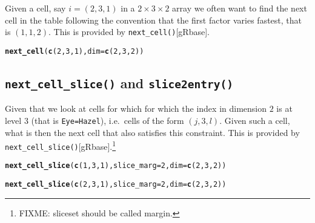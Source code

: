 \documentclass[10pt]{article}\usepackage[]{graphicx}\usepackage[]{xcolor}
\makeatletter
\newcommand{\hlnum}[1]{\textcolor[rgb]{0.686,0.059,0.569}{#1}}%
\newcommand{\hlstd}[1]{\textcolor[rgb]{0.345,0.345,0.345}{#1}}%
\newcommand{\hlkwc}[1]{\textcolor[rgb]{0.333,0.667,0.333}{#1}}%
\newcommand{\hlkwd}[1]{\textcolor[rgb]{0.737,0.353,0.396}{\textbf{#1}}}%
\newenvironment{kframe}{%
 \def\at@end@of@kframe{}%
 \ifinner\ifhmode%
  \def\at@end@of@kframe{\end{minipage}}%
  \begin{minipage}{\columnwidth}%
 \fi\fi%
 \def\FrameCommand##1{\hskip\@totalleftmargin \hskip-\fboxsep
 \colorbox{shadecolor}{##1}\hskip-\fboxsep
     \hskip-\linewidth \hskip-\@totalleftmargin \hskip\columnwidth}%
 \MakeFramed {\advance\hsize-\width
   \@totalleftmargin\z@ \linewidth\hsize
   \@setminipage}}%
 {\par\unskip\endMakeFramed%
 \at@end@of@kframe}
\newenvironment{knitrout}{}{} %
\def\code#1{\texttt{#1}}
\def\rr#1{\code{#1}[{\scriptsize gRbase}]}
\makeatother
\begin{document}
Given a cell, say $i=(2,3,1)$ in a $2\times 3\times 2$ array we often want to find the next cell in
the table following the convention that the first factor varies
fastest, that is $(1,1,2)$. This is provided by
\rr{next\_cell()}.
\begin{knitrout}\small
{}\color{fgcolor}\begin{kframe}
\begin{alltt}
\hlkwd{next_cell}\hlstd{(}\hlkwd{c}\hlstd{(}\hlnum{2}\hlstd{,}\hlnum{3}\hlstd{,}\hlnum{1}\hlstd{),} \hlkwc{dim}\hlstd{=}\hlkwd{c}\hlstd{(}\hlnum{2}\hlstd{,} \hlnum{3}\hlstd{,} \hlnum{2}\hlstd{))}
\end{alltt}


{\ttfamily\noindent\bfseries{}}\end{kframe}
\end{knitrout}


\subsection{\code{next\_cell\_slice()} and \code{slice2entry()}}

Given that we look at cells for which for which the index in dimension $2$ is at level $3$ (that is
\verb|Eye=Hazel|), i.e.\ cells of the form $(j,3,l)$. Given such a
cell, what is then the next cell that also satisfies this
constraint. This is provided by
\rr{next\_cell\_slice()}.\footnote{FIXME: sliceset should be called margin.}
\begin{knitrout}\small
{}\color{fgcolor}\begin{kframe}
\begin{alltt}
\hlkwd{next_cell_slice}\hlstd{(}\hlkwd{c}\hlstd{(}\hlnum{1}\hlstd{,}\hlnum{3}\hlstd{,}\hlnum{1}\hlstd{),} \hlkwc{slice_marg}\hlstd{=}\hlnum{2}\hlstd{,} \hlkwc{dim}\hlstd{=}\hlkwd{c}\hlstd{(} \hlnum{2}\hlstd{,} \hlnum{3}\hlstd{,} \hlnum{2} \hlstd{))}
\end{alltt}


{\ttfamily\noindent\bfseries{}}\begin{alltt}
\hlkwd{next_cell_slice}\hlstd{(}\hlkwd{c}\hlstd{(}\hlnum{2}\hlstd{,}\hlnum{3}\hlstd{,}\hlnum{1}\hlstd{),} \hlkwc{slice_marg}\hlstd{=}\hlnum{2}\hlstd{,} \hlkwc{dim}\hlstd{=}\hlkwd{c}\hlstd{(} \hlnum{2}\hlstd{,} \hlnum{3}\hlstd{,} \hlnum{2} \hlstd{))}
\end{alltt}


{\ttfamily\noindent\bfseries{}}\end{kframe}
\end{knitrout}
\end{document}
